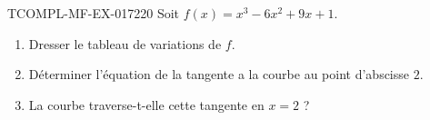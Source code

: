 \begin{exercice}{TCOMPL-MF-EX-017}{2}{20}
Soit $f(x) = x^3 - 6x^2 + 9x + 1$.
\begin{enumerate}
  \item Dresser le tableau de variations de $f$.
  \item Déterminer l'équation de la tangente a la courbe au point d'abscisse $2$.
  \item La courbe traverse-t-elle cette tangente en $x = 2$ ?
\end{enumerate}

\end{exercice}
